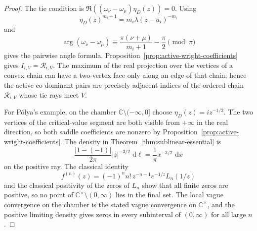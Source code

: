 \documentclass[reqno]{article}
\theoremstyle{definition}
\theoremstyle{remark}
\theoremstyle{plain}
\newcommand{\C}{\mathbb C}
\newcommand{\dd}{\,\mathrm d}
\begin{document}
\begin{proof}
The tie condition is $\Re((\omega_\nu-\omega_\mu)\eta_D(z))=0$. Using
\[
\eta_D(z)^{m_i+1}=m_i\lambda(z-a_i)^{-m_i}
\]
and
\[
\arg(\omega_\nu-\omega_\mu)\equiv \frac{\pi(\nu+\mu)}{m_i+1}-\frac{\pi}{2}\pmod{\pi}
\]
gives the pairwise angle formula. Proposition~\ref{prop:active-wright-coefficients} gives $I_{i,V}=\mathcal R_{i,V}$. The maximum of the real projection over the vertices of a convex chain can have a two-vertex face only along an edge of that chain; hence the active co-dominant pairs are precisely adjacent indices of the ordered chain $\mathcal R_{i,V}$ whose tie rays meet $V$.

For P\'olya's example, on the chamber $\C\setminus(-\infty,0]$ choose $\eta_D(z)=iz^{-1/2}$. The two vertices of the critical-value segment are both visible from $+\infty$ in the real direction, so both saddle coefficients are nonzero by Proposition~\ref{prop:active-wright-coefficients}. The density in Theorem~\ref{thm:sublinear-essential} is
\[
\frac{|1-(-1)|}{2\pi}|z|^{-3/2}\,\dd\ell=\frac1\pi x^{-3/2}\,\dd x
\]
on the positive ray. The classical identity
\[
f^{(n)}(z)=(-1)^n n!\,z^{-n-1}e^{-1/z}L_n(1/z)
\]
and the classical positivity of the zeros of $L_n$ show that all finite zeros are positive, so no point of $\C^\times\setminus(0,\infty)$ lies in the final set. The local vague convergence on the chamber is the stated vague convergence on $\C^\times$, and the positive limiting density gives zeros in every subinterval of $(0,\infty)$ for all large $n$.
\end{proof}
\end{document}
